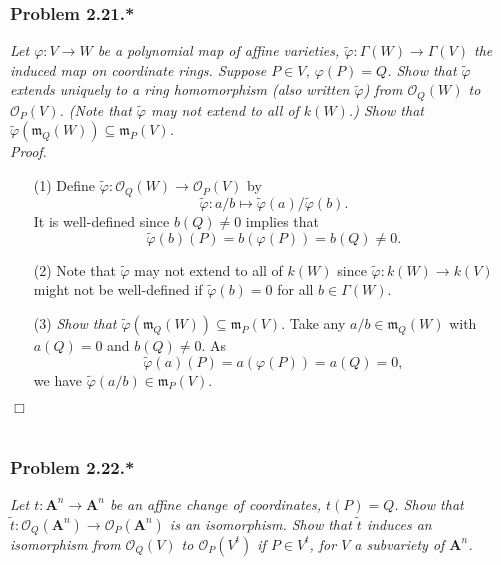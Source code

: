 \documentclass{article}
\begin{document}
\subsubsection*{Problem 2.21.*}
\emph{Let $\varphi: V \to W$ be a polynomial map of affine varieties,
$\widetilde{\varphi}: \Gamma(W) \to \Gamma(V)$ the induced map on coordinate rings.
Suppose $P \in V$, $\varphi(P) = Q$.
Show that $\widetilde{\varphi}$ extends uniquely to a ring homomorphism
(also written $\widetilde{\varphi}$) from $\mathscr{O}_Q(W)$ to $\mathscr{O}_P(V)$.
(Note that $\widetilde{\varphi}$ may not extend to all of $k(W)$.)
Show that $\widetilde{\varphi}(\mathfrak{m}_Q(W)) \subseteq \mathfrak{m}_P(V)$.} \\



\emph{Proof.}
\begin{enumerate}
\item[(1)]
  Define $\widetilde{\varphi}: \mathscr{O}_Q(W) \to \mathscr{O}_P(V)$ by
  \[
    \widetilde{\varphi}: a/b
    \mapsto \widetilde{\varphi}(a)/\widetilde{\varphi}(b).
  \]
  It is well-defined since $b(Q) \neq 0$ implies that
  \[
    \widetilde{\varphi}(b)(P) = b(\varphi(P)) = b(Q) \neq 0.
  \]

\item[(2)]
  Note that $\widetilde{\varphi}$ may not extend to all of $k(W)$
  since $\widetilde{\varphi}: k(W) \to k(V)$
  might not be well-defined if $\widetilde{\varphi}(b) = 0$ for all $b \in \Gamma(W)$.

\item[(3)]
  \emph{Show that $\widetilde{\varphi}(\mathfrak{m}_Q(W)) \subseteq \mathfrak{m}_P(V)$}.
  Take any $a/b \in \mathfrak{m}_Q(W)$ with $a(Q) = 0$ and $b(Q) \neq 0$.
  As
  \[
    \widetilde{\varphi}(a)(P) = a(\varphi(P)) = a(Q) = 0,
  \]
  we have
  $\widetilde{\varphi}(a/b) \in \mathfrak{m}_P(V)$.
\end{enumerate}
$\Box$ \\\\






\subsubsection*{Problem 2.22.*}
\emph{Let $t: \mathbf{A}^{n} \to \mathbf{A}^{n}$ be an affine change of coordinates, $t(P) = Q$.
Show that
$\widetilde{t}: \mathscr{O}_Q(\mathbf{A}^{n}) \to \mathscr{O}_P(\mathbf{A}^{n})$ is an isomorphism.
Show that $\widetilde{t}$ induces an isomorphism from
$\mathscr{O}_Q(V)$ to $\mathscr{O}_P(V^{t})$ if $P \in V^{t}$,
for $V$ a subvariety of $\mathbf{A}^{n}$.} \\
\end{document}
